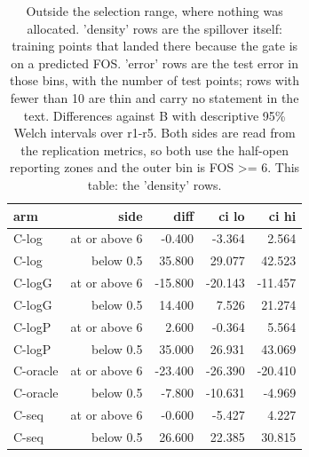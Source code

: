 \begin{table}[htbp]
\centering
\small
\setlength{\tabcolsep}{4pt}
\caption{Outside the selection range, where nothing was allocated. 'density' rows are the spillover itself: training points that landed there because the gate is on a predicted FOS. 'error' rows are the test error in those bins, with the number of test points; rows with fewer than 10 are thin and carry no statement in the text. Differences against B with descriptive 95\% Welch intervals over r1-r5. Both sides are read from the replication metrics, so both use the half-open reporting zones and the outer bin is FOS >= 6. This table: the 'density' rows.}
\label{tab:structural:outside:density}
\begin{tabular}{lrrrr}
\toprule
arm & side & diff & ci lo & ci hi \\
\midrule
C-log & at or above 6 & -0.400 & -3.364 & 2.564 \\
C-log & below 0.5 & 35.800 & 29.077 & 42.523 \\
C-logG & at or above 6 & -15.800 & -20.143 & -11.457 \\
C-logG & below 0.5 & 14.400 & 7.526 & 21.274 \\
C-logP & at or above 6 & 2.600 & -0.364 & 5.564 \\
C-logP & below 0.5 & 35.000 & 26.931 & 43.069 \\
C-oracle & at or above 6 & -23.400 & -26.390 & -20.410 \\
C-oracle & below 0.5 & -7.800 & -10.631 & -4.969 \\
C-seq & at or above 6 & -0.600 & -5.427 & 4.227 \\
C-seq & below 0.5 & 26.600 & 22.385 & 30.815 \\
\bottomrule
\end{tabular}
\end{table}
